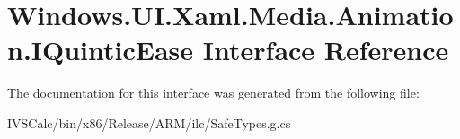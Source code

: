 \hypertarget{interface_windows_1_1_u_i_1_1_xaml_1_1_media_1_1_animation_1_1_i_quintic_ease}{}\section{Windows.\+U\+I.\+Xaml.\+Media.\+Animation.\+I\+Quintic\+Ease Interface Reference}
\label{interface_windows_1_1_u_i_1_1_xaml_1_1_media_1_1_animation_1_1_i_quintic_ease}


The documentation for this interface was generated from the following file\+:\begin{DoxyCompactItemize}
\item 
I\+V\+S\+Calc/bin/x86/\+Release/\+A\+R\+M/ilc/Safe\+Types.\+g.\+cs\end{DoxyCompactItemize}
